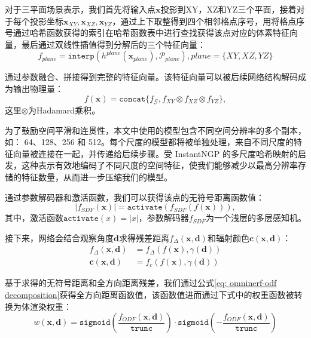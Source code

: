 对于三平面场景表示，我们首先将输入点$\mathbf{x}$投影到XY，XZ和YZ三个平面，接着对于每个投影坐标$\mathbf{x}_{XY},\mathbf{x}_{XZ},\mathbf{x}_{YZ}$，通过上下取整得到四个相邻格点序号，用将格点序号通过哈希函数获得的索引在哈希函数表中进行查找获得该点对应的体素特征向量，最后通过双线性插值得到分解后的三个特征向量：
\begin{equation}
    f_{plane} = \mathtt{interp}(h^{plane}(\mathbf{x}_{plane}), \mathcal{P}_{plane})
    ,plane=\{XY,XZ,YZ\}
\end{equation}

通过参数融合、拼接得到完整的特征向量。该特征向量可以被后续网络结构解码成为输出物理量：
\begin{equation}
    f(\mathbf{x}) = \mathtt{concat}\{f_{\mathcal{G}}, f_{XY}\otimes f_{XZ} \otimes f_{YZ}\},
\end{equation}
这里$\otimes$为Hadamard乘积\cite{fridovich-keil_k-planes_2023}。

为了鼓励空间平滑和连贯性，本文中使用的模型包含不同空间分辨率的多个副本，如： 64、128、256 和 512。每个尺度的模型都将被单独处理，来自不同尺度的特征向量被连接在一起，并传递给后续步骤。受 InstantNGP \cite{muller_instant_2022} 的多尺度哈希映射的启发，这种表示有效地编码了不同尺度的空间特征，使我们能够减少以最高分辨率存储的特征数量，从而进一步压缩我们的模型。

通过参数解码器和激活函数，我们可以获得该点的无符号距离函数值：
\begin{equation}
    |f_{SDF}(\mathbf{x})| = \mathtt{activate}(f_{SDF}(f(\mathbf{x}))),
\end{equation}
其中，激活函数$\mathtt{activate}(x)=|x|$，参数解码器$f_{SDF}$为一个浅层的多层感知机。

接下来，网络会结合观察角度$\mathbf{d}$求得残差距离$f_\Delta(\mathbf{x}, \mathbf{d})$和辐射颜色$\mathbf{c}(\mathbf{x},\mathbf{d})$：
\begin{align}
    f_\Delta(\mathbf{x}, \mathbf{d})&=f_\Delta(f(\mathbf{x}), \gamma(\mathbf{d}))\\
    \mathbf{c}(\mathbf{x},\mathbf{d}) &=f_c(f(\mathbf{x}), \gamma(\mathbf{d}))
\end{align}

基于求得的无符号距离和全方向距离残差，我们通过公式\ref{eq: omninerf-odf decomposition}获得全方向距离函数值，该函数值进而通过下式中的权重函数被转换为体渲染权重：
\begin{equation}
    w(\mathbf{x},\mathbf{d}) = \mathtt{sigmoid}\left(\frac{f_{ODF}(\mathbf{x},\mathbf{d})}{\mathtt{trunc}}\right)\cdot\mathtt{sigmoid}\left(-\frac{f_{ODF}(\mathbf{x},\mathbf{d})}{\mathtt{trunc}}\right)
\end{equation}

